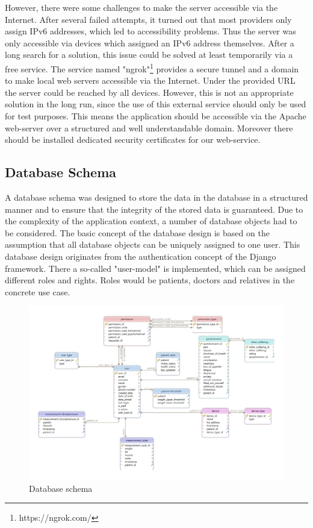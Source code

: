 However, there were some challenges to make the server accessible via the Internet. After several failed attempts, it turned out that most providers only assign IPv6 addresses, which led to accessibility problems. Thus the server was only accessible via devices which assigned an IPv6 address themselves. After a long search for a solution, this issue could be solved at least temporarily via a free service. The service named "ngrok"\footnote{https://ngrok.com/} provides a secure tunnel and a domain to make local web servers accessible via the Internet. Under the provided URL the server could be reached by all devices. However, this is not an appropriate solution in the long run, since the use of this external service should only be used for test purposes. This means the application should be accessible via the Apache web-server over a structured and well understandable domain. Moreover there should be installed dedicated security certificates for our web-service.


\subsection{Database Schema}
A database schema was designed to store the data in the database in a structured manner and to ensure that the integrity of the stored data is guaranteed. Due to the complexity of the application context, a number of database objects had to be considered. The basic concept of the database design is based on the assumption that all database objects can be uniquely assigned to one user. This database design originates from the authentication concept of the Django framework. There a so-called "user-model" is implemented, which can be assigned different roles and rights. Roles would be patients, doctors and relatives in the concrete use case. 


\begin{figure}[h]
    \centering
    \includegraphics[width = \textwidth]{figures/dataScheme_Bericht.png}
    \caption[Database schema]{Database schema}
    \label{fig:DBSchema}
\end{figure}

